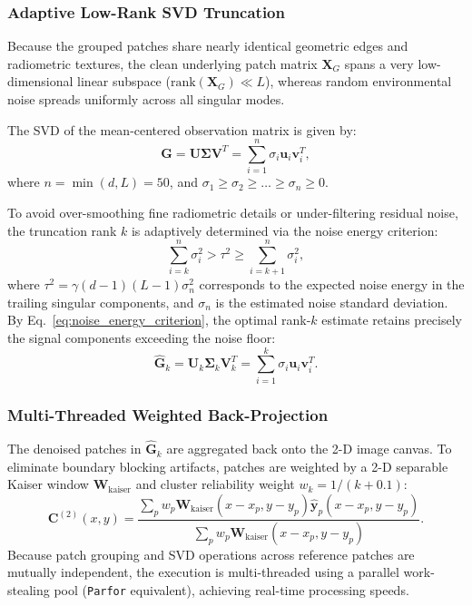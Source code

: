 \subsubsection{Adaptive Low-Rank SVD Truncation}
Because the grouped patches share nearly identical geometric edges and radiometric textures, the clean underlying patch matrix $\mathbf{X}_G$ spans a very low-dimensional linear subspace ($\mathrm{rank}(\mathbf{X}_G) \ll L$), whereas random environmental noise spreads uniformly across all singular modes.

The SVD of the mean-centered observation matrix is given by:
\begin{equation}
\label{eq:patch_svd}
\mathbf{G} = \mathbf{U} \mathbf{\Sigma} \mathbf{V}^T = \sum_{i=1}^n \sigma_i \mathbf{u}_i \mathbf{v}_i^T,
\end{equation}
where $n = \min(d, L) = 50$, and $\sigma_1 \ge \sigma_2 \ge \dots \ge \sigma_n \ge 0$.

To avoid over-smoothing fine radiometric details or under-filtering residual noise, the truncation rank $k$ is adaptively determined via the noise energy criterion:
\begin{equation}
\label{eq:noise_energy_criterion}
\sum_{i=k}^n \sigma_i^2 > \tau^2 \ge \sum_{i=k+1}^n \sigma_i^2,
\end{equation}
where $\tau^2 = \gamma (d - 1)(L - 1) \sigma_n^2$ corresponds to the expected noise energy in the trailing singular components, and $\sigma_n$ is the estimated noise standard deviation. By Eq.~\eqref{eq:noise_energy_criterion}, the optimal rank-$k$ estimate retains precisely the signal components exceeding the noise floor:
\begin{equation}
\label{eq:lowrank_patch_recon}
\widehat{\mathbf{G}}_k = \mathbf{U}_k \mathbf{\Sigma}_k \mathbf{V}_k^T = \sum_{i=1}^k \sigma_i \mathbf{u}_i \mathbf{v}_i^T.
\end{equation}

\subsubsection{Multi-Threaded Weighted Back-Projection}
The denoised patches in $\widehat{\mathbf{G}}_k$ are aggregated back onto the 2-D image canvas. To eliminate boundary blocking artifacts, patches are weighted by a 2-D separable Kaiser window $\mathbf{W}_{\mathrm{kaiser}}$ and cluster reliability weight $w_k = 1 / (k + 0.1)$:
\begin{equation}
\label{eq:back_projection}
\mathbf{C}^{(2)}(x, y) = \frac{\sum_{p} w_p \mathbf{W}_{\mathrm{kaiser}}(x - x_p, y - y_p) \widehat{\mathbf{y}}_p(x - x_p, y - y_p)}{\sum_{p} w_p \mathbf{W}_{\mathrm{kaiser}}(x - x_p, y - y_p)}.
\end{equation}
Because patch grouping and SVD operations across reference patches are mutually independent, the execution is multi-threaded using a parallel work-stealing pool (\texttt{Parfor} equivalent), achieving real-time processing speeds.

